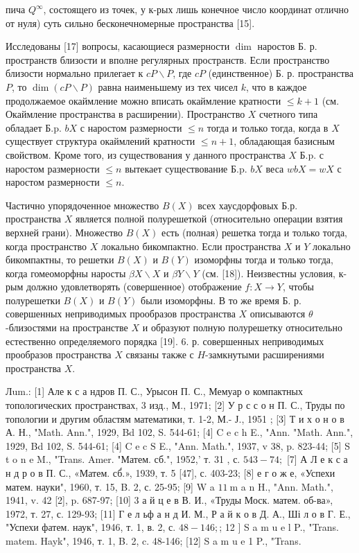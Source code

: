 \documentclass[10pt]{article}
\begin{document}
пича $Q^{\infty}$, состоящего из точек, у к-рых лишь конечное число координат отлично от нуля) суть сильно бесконечномерные пространства [15].



Исследованы [17] вопросы, касающиеся размерности $\operatorname{dim}$ наростов Б. р. пространств близости и вполне регулярных пространств. Если пространство близости нормально прилегает к $c P \backslash P$, где $c P$ (единственное) Б. р. пространства $P$, то $\operatorname{dim}(c P \backslash P)$ равна наименьшему из тех чисел $k$, что в каждое продолжаемое окаймление можно вписать окаймление кратности $\leqslant k+1$ (см. Окаймление пространства в расширении). Пространство $X$ счетного типа обладает Б.p. $b X$ с наростом размерности $\leqslant n$ тогда и только тогда, когда в $X$ существует структура окаймлений кратности $\leqslant n+1$, обладающая базисным свойством. Кроме того, из существования у данного пространства $X$ Б.p. с наростом размерности $\leqslant n$ вытекает существование Б.p. $b X$ веса $w b X=w X$ с наростом размерности $\leqslant n$.



Частично упорядоченное множество $B(X)$ всех хаусдорфовых Б.р. пространства $X$ является полной полурешеткой (относительно операции взятия верхней грани). Множество $B(X)$ есть (полная) решетка тогда и только тогда, когда пространство $X$ локально бикомпактно. Если пространства $X$ и $Y$ локально бикомпактны, то решетки $B(X)$ и $B(Y)$ изоморфны тогда и только тогда, когда гомеоморфны наросты $\beta X \backslash X$ и $\beta Y \backslash Y$ (см. [18]). Неизвестны условия, к-рым должно удовлетворять (совершенное) отображение $f: X \rightarrow Y$, чтобы полурешетки $B(X)$ и $B(Y)$ были изоморфны. В то же время Б. р. совершенных неприводимых прообразов пространства $X$ описываются $\theta$-близостями на пространстве $X$ и образуют полную полурешетку относительно естественно определяемого порядка [19]. 6. р. совершенных неприводимых прообразов пространства $X$ связаны также с $H$-замкнутыми расширениями пространства $X$.



Лum.: [1] Але к с а ндров П. С., Урысон П. С., Мемуар о компактных топологических пространствах, 3 изд., М., 1971; [2] У р с с о н П. С., Труды по топологии и другим областям математики, т. 1-2, М.- Ј., 1951 ; [3] Т и х о н о в А. Н., "Math. Ann.", 1929, Bd 102, S. 544-61; [4] C e c h E., "Ann. "Math. Ann.", 1929, Bd 102, S. 544-61; [4] C e c $\mathrm{S}$ E., "Ann. Math.", 1937, v 38, p. 823-44; [5] S t o n e M., "Trans. Amer. "Матем. сб.", 1952,' т. 31 , с. $543-74 ;$ [7] А Л е к с а н д р о в П. С., «Матем. сб́.», 1939, т. 5 [47], с. 403-23; [8] е г о ж е, «Успехи матем. науки", 1960, т. 15, B. 2, с. 25-95; [9] W a $11 \mathrm{~m}$ a n H., "Ann. Math.", 1941, v. 42 [2], p. 687-97; [10] 3 а й ц е в В. И., «Труды Моск. матем. об-ва», 1972, т. 27, с. 129-93; [11] Г е л ьф а н д И. М., Р а й к о в Д. А., Ші л о в Г. Е., "Успехи фатем. наук", 1946, т. 1, в. 2, с. $48-146 ;$; 12 ] S a m u e l P., "Trans. matem. Hayk", 1946, т. 1, B. 2, c. 48-146; [12] S a m u e 1 P., "Trans.
\end{document}
